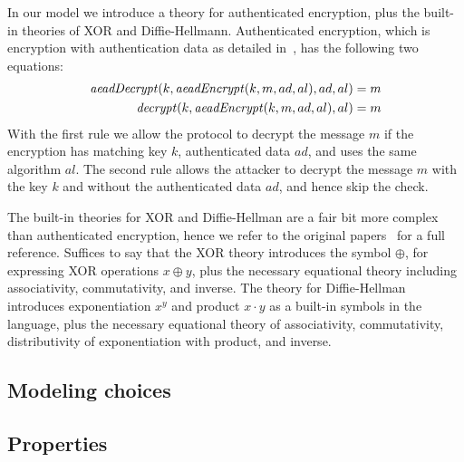 In our model we introduce a theory for authenticated encryption, plus the built-in theories of XOR and Diffie-Hellmann.
Authenticated encryption, which is encryption with authentication data as detailed in~\cite{aead}, has the following two equations:
\begin{align*}
  \mathit{aeadDecrypt}(k, \mathit{aeadEncrypt}(k, m, ad, al), ad, al) = m\\
  \mathit{decrypt}(k, \mathit{aeadEncrypt}(k, m, ad, al), al) = m
\end{align*}
With the first rule we allow the protocol to decrypt the message $m$ if the encryption has matching key $k$, authenticated data $ad$, and uses the same algorithm $al$.
The second rule allows the attacker to decrypt the message $m$ with the key $k$ and without the authenticated data $ad$, and hence skip the check.

The built-in theories for XOR and Diffie-Hellman are a fair bit more complex than authenticated encryption, hence we refer to the original papers~\cite{xorTamarin,dhTamarin} for a full reference.
Suffices to say that the XOR theory introduces the symbol $\oplus$, for expressing XOR operations $x \oplus y$, plus the necessary equational theory including associativity, commutativity, and inverse.
The theory for Diffie-Hellman introduces exponentiation $x^y$ and product $x \cdot y$ as a built-in symbols in the language, plus the necessary equational theory of associativity, commutativity, distributivity of exponentiation with product, and inverse.

\subsection{Modeling choices}

\subsection{Properties}
